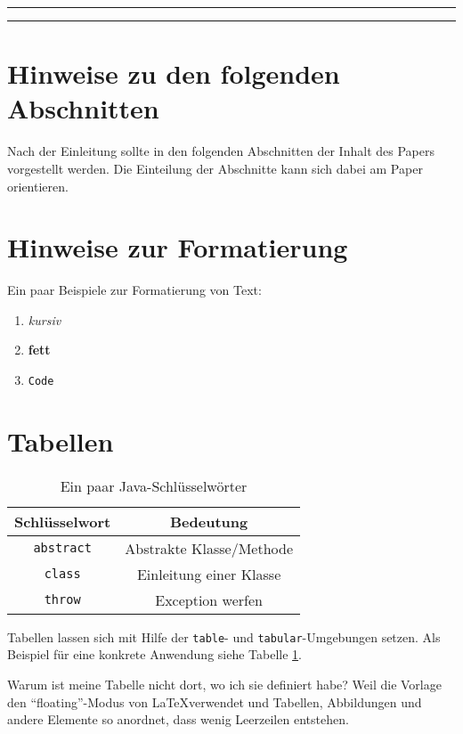 \documentclass[ngerman]{ewks-latex}
\begin{document}



\pagebreak
\rule{0.45\textwidth}{0.4pt}
\pagebreak
\rule{0.45\textwidth}{0.4pt}
\pagebreak


\section{Hinweise zu den folgenden Abschnitten}
Nach der Einleitung sollte in den folgenden Abschnitten der Inhalt des Papers vorgestellt werden. Die Einteilung der Abschnitte kann sich dabei am Paper orientieren.

\section{Hinweise zur Formatierung}
Ein paar Beispiele zur Formatierung von Text:
\begin{enumerate}
\item \textit{kursiv}
\item \textbf{fett}
\item \texttt{Code}
\end{enumerate}

\section{Tabellen}
\begin{table} %
\centering %
\caption{Ein paar Java-Schlüsselwörter} %
\label{tab:example} %
\begin{tabular}{|c|c|} \hline %
Schlüsselwort & Bedeutung \\ \hline %
\texttt{abstract} & Abstrakte Klasse/Methode \\ \hline %
\texttt{class} & Einleitung einer Klasse \\ \hline %
\texttt{throw} & Exception werfen \\ \hline %
\end{tabular}
\end{table}

Tabellen lassen sich mit Hilfe der \texttt{table}- und \texttt{tabular}-Umgebungen setzen. Als Beispiel für eine konkrete Anwendung siehe Tabelle \ref{tab:example}.

Warum ist meine Tabelle nicht dort, wo ich sie definiert habe? Weil die Vorlage den "`floating"'-Modus von \LaTeX verwendet und Tabellen, Abbildungen und andere Elemente so anordnet, dass wenig Leerzeilen entstehen.
\end{document}

